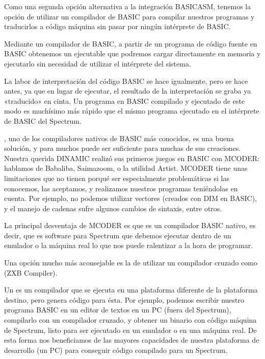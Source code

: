 \documentclass[letterpaper,10pt,spanish]{sphinxmanual}
\begin{document}
Como una segunda opción alternativa a la integración BASIC\sphinxhyphen{}ASM, tenemos la opción de utilizar un compilador de BASIC para compilar nuestros programas y traducirlos a código máquina sin pasar por ningún intérprete de BASIC.

Mediante un compilador de BASIC, a partir de un programa de código fuente en BASIC obtenemos un ejecutable que podremos cargar directamente en memoria y ejecutarlo sin necesidad de utilizar el intérprete del sistema.

La labor de interpretación del código BASIC se hace igualmente, pero se hace antes, ya que en lugar de ejecutar, el resultado de la interpretación se graba ya «traducido» en cinta. Un programa en BASIC compilado y ejecutado de este modo es muchísimo más rápido que el mismo programa ejecutado en el intérprete de BASIC del Spectrum.

, uno de los compiladores nativos de BASIC más conocidos, es una buena solución, y para muchos puede ser suficiente para muchas de sus creaciones. Nuestra querida DINAMIC realizó sus primeros juegos en BASIC con MCODER: hablamos de Babaliba, Saimazoom, o la utilidad Artist. MCODER tiene unas limitaciones que no tienen porqué ser especialmente problemáticas si las conocemos, las aceptamos, y realizamos nuestros programas teniéndolas en cuenta. Por ejemplo, no podemos utilizar vectores (creados con DIM en BASIC), y el manejo de cadenas sufre algunos cambios de sintaxis, entre otros.

La principal desventaja de MCODER es que es un compilador BASIC nativo, es decir, que es software para Spectrum que debemos ejecutar dentro de un emulador o la máquina real lo que nos puede ralentizar a la hora de programar.

Una opción mucho más aconsejable es la de utilizar un compilador cruzado como  (ZXB Compiler).

Un  es un compilador que se ejecuta en una plataforma diferente de la plataforma destino, pero genera código para ésta. Por ejemplo, podemos escribir nuestro programa BASIC en un editor de textos en un PC (fuera del Spectrum), compilarlo con un compilador cruzado, y obtener un binario con código máquina de Spectrum, listo para ser ejecutado en un emulador o en una máquina real. De esta forma nos beneficiamos de las mayores capacidades de nuestra plataforma de desarrollo (un PC) para conseguir código compilado para un Spectrum.
\end{document}
